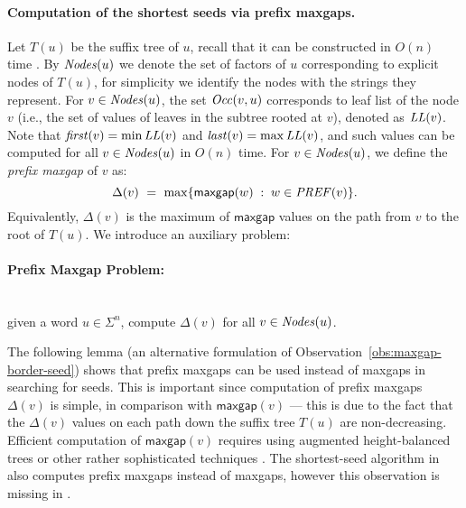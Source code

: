 \documentclass{llncs}
\newcommand{\Tree}{T}
\newcommand{\Nodes}{\mbox{\textit{Nodes}}}
\newcommand{\firstocc}{\mbox{\textit{first}}}
\newcommand{\lastocc}{\mbox{\textit{last}}}
\newcommand{\Occ}{\mbox{\textit{Occ}}}
\newcommand{\LL}{\mbox{\textit{LL}}}
\newcommand{\maxgap}{\textsf{maxgap}}
\newcommand{\prefmaxgap}{\Delta}
\newcommand{\PREF}{\mbox{\textit{PREF}}}
\begin{document}
\medskip
\paragraph{\bf Computation of the shortest seeds via prefix maxgaps.}
  \noindent
  Let $\Tree(u)$ be the suffix tree of $u$, recall that it can
  be constructed in $O(n)$ time \cite{AlgorithmsOnStrings,Jewels}.
  By $\Nodes(u)$ we denote the set of factors of $u$ corresponding to explicit nodes
  of $\Tree(u)$, for simplicity we identify the nodes with the strings they represent.
  For $v \in \Nodes(u)$, the set $\Occ(v,u)$ corresponds to leaf list of the node $v$
  (i.e., the set of values of leaves in the subtree rooted at $v$), denoted as $\LL(v)$.
  Note that $\firstocc(v)=\min\LL(v)$ and $\lastocc(v)=\max\LL(v)$, and
  such values can be computed for all $v \in \Nodes(u)$ in $O(n)$ time.
  For $v \in \Nodes(u)$, we define the \emph{prefix maxgap} of $v$ as:
  $$
    \prefmaxgap(v)\ =\ \max\{\maxgap(w)\;:\; w \in \PREF(v)\}.
  $$
  Equivalently, $\prefmaxgap(v)$ is the maximum of $\maxgap$ values on the path from $v$
  to the root of $\Tree(u)$.
  We introduce an auxiliary problem:

  \paragraph{\bf Prefix Maxgap Problem:}~\\
  \indent
  given a word $u \in \Sigma^n$,
  compute $\prefmaxgap(v)$ for all $v \in \Nodes(u)$.

\vskip 0.3cm \noindent
  The following lemma (an alternative formulation of Observation~\ref{obs:maxgap-border-seed}) shows that
  prefix maxgaps can be used instead of maxgaps in searching for seeds.
  This is important since computation of prefix maxgaps $\prefmaxgap(v)$ is simple, 
  in comparison with $\maxgap(v)$ --- this is due to the fact that the $\prefmaxgap(v)$ values
  on each path down the suffix tree $\Tree(u)$ are non-decreasing.
  Efficient computation of $\maxgap(v)$ requires using augmented height-balanced trees \cite{DBLP:conf/cpm/BrodalP00}
  or other rather sophisticated techniques \cite{DBLP:journals/iandc/BerkmanIP95}.
  The shortest-seed algorithm in \cite{DBLP:journals/algorithmica/IliopoulosMP96} also
  computes prefix maxgaps instead of maxgaps, however this observation is missing in
  \cite{DBLP:journals/algorithmica/IliopoulosMP96}.
\end{document}
